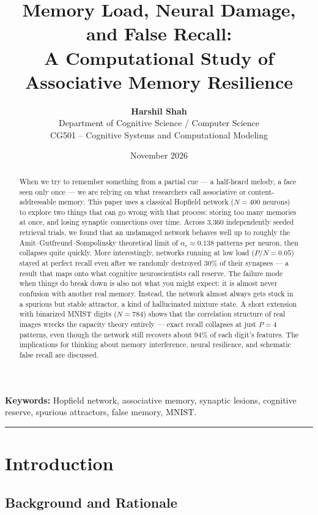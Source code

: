 \documentclass[11pt,a4paper]{article}
\title{\textbf{Memory Load, Neural Damage, and False Recall:\\
A Computational Study of Associative Memory Resilience}}
\author{\textbf{Harshil Shah}\\
Department of Cognitive Science / Computer Science\\
CG501 -- Cognitive Systems and Computational Modeling}
\date{November 2026}
\begin{document}
\maketitle

\begin{abstract}
When we try to remember something from a partial cue --- a half-heard melody, a face seen only once --- we are relying on what researchers call associative or content-addressable memory. This paper uses a classical Hopfield network ($N=400$ neurons) to explore two things that can go wrong with that process: storing too many memories at once, and losing synaptic connections over time. Across 3,360 independently seeded retrieval trials, we found that an undamaged network behaves well up to roughly the Amit--Gutfreund--Sompolinsky theoretical limit of $\alpha_c \approx 0.138$ patterns per neuron, then collapses quite quickly. More interestingly, networks running at low load ($P/N = 0.05$) stayed at perfect recall even after we randomly destroyed 30\% of their synapses --- a result that maps onto what cognitive neuroscientists call reserve. The failure mode when things do break down is also not what you might expect: it is almost never confusion with another real memory. Instead, the network almost always gets stuck in a spurious but stable attractor, a kind of hallucinated mixture state. A short extension with binarized MNIST digits ($N=784$) shows that the correlation structure of real images wrecks the capacity theory entirely --- exact recall collapses at just $P=4$ patterns, even though the network still recovers about 94\% of each digit's features. The implications for thinking about memory interference, neural resilience, and schematic false recall are discussed.
\end{abstract}

\noindent\textbf{Keywords:} Hopfield network, associative memory, synaptic lesions, cognitive reserve, spurious attractors, false memory, MNIST.

\vspace{0.8em}
\hrule
\vspace{1em}

\section{Introduction}

\subsection{Background and Rationale}
\end{document}
